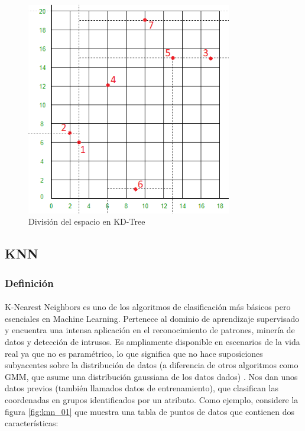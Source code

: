 \documentclass{article}
\begin{document}
\begin{figure}[h!]
	\centering
	\includegraphics[width=0.8\textwidth]{img/kdtree_2.png}
	\caption{División del espacio en KD-Tree}
	\label{fig:kdtree_02}
\end{figure}

\clearpage
\subsection{KNN}
\subsubsection{Definición}
\paragraph{}
K-Nearest Neighbors es uno de los algoritmos de clasificación más básicos pero esenciales en Machine Learning. Pertenece al dominio de aprendizaje supervisado y encuentra una intensa aplicación en el reconocimiento de patrones, minería de datos y detección de intrusos.
Es ampliamente disponible en escenarios de la vida real ya que no es paramétrico, lo que significa que no hace suposiciones subyacentes sobre la distribución de datos (a diferencia de otros algoritmos como GMM, que asume una distribución gaussiana de los datos dados) .
Nos dan unos datos previos (también llamados datos de entrenamiento), que clasifican las coordenadas en grupos identificados por un atributo.
Como ejemplo, considere la figura \ref{fig:knn_01} que muestra una tabla de puntos de datos que contienen dos características:
\end{document}
